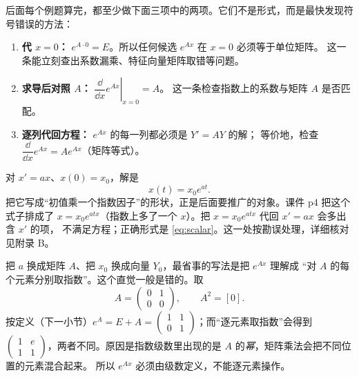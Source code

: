 \documentclass[11pt]{ctexart}
\newcommand{\pmat}[1]{\begin{pmatrix}#1\end{pmatrix}}
\newcommand{\zero}{[0]}
\begin{document}

后面每个例题算完，都至少做下面三项中的两项。它们不是形式，而是最快发现符号错误的方法：
\begin{enumerate}
  \item \textbf{代 $x=0$：} $e^{A\cdot0}=E$。所以任何候选 $e^{Ax}$ 在 $x=0$ 必须等于单位矩阵。
        这一条能立刻查出系数漏乘、特征向量矩阵取错等问题。
  \item \textbf{求导后对照 $A$：} $\left.\dfrac{\dd}{\dd x}e^{Ax}\right|_{x=0}=A$。
        这一条检查指数上的系数与矩阵 $A$ 是否匹配。
  \item \textbf{逐列代回方程：} $e^{Ax}$ 的每一列都必须是 $Y'=AY$ 的解；
        等价地，检查 $\dfrac{\dd}{\dd x}e^{Ax}=Ae^{Ax}$（矩阵等式）。
\end{enumerate}



对 $x'=ax$、$x(0)=x_0$，解是
\begin{equation}\label{eq:scalar}
x(t)=x_0e^{at}.
\end{equation}
把它写成“初值乘一个指数因子”的形状，正是后面要推广的对象。课件 p4 把这个式子排成了
$x=x_0e^{atx}$（指数上多了一个 $x$）。把 $x=x_0e^{atx}$ 代回 $x'=ax$ 会多出含 $x'$ 的项，
不满足方程；正确形式是 \eqref{eq:scalar}。这一处按勘误处理，详细核对见附录 B。


把 $a$ 换成矩阵 $A$、把 $x_0$ 换成向量 $Y_0$，最省事的写法是把 $e^{Ax}$ 理解成
“对 $A$ 的每个元素分别取指数”。这个直觉一般是错的。取
\[
A=\pmat{0&1\\0&0},\qquad A^2=\zero .
\]
按定义（下一小节）$e^{A}=E+A=\pmat{1&1\\0&1}$；而“逐元素取指数”会得到
$\pmat{1&e\\1&1}$，两者不同。原因是指数级数里出现的是 $A$ 的\emph{幂}，矩阵乘法会把不同位置的元素混合起来。
所以 $e^{Ax}$ 必须由级数定义，不能逐元素操作。


\end{document}
